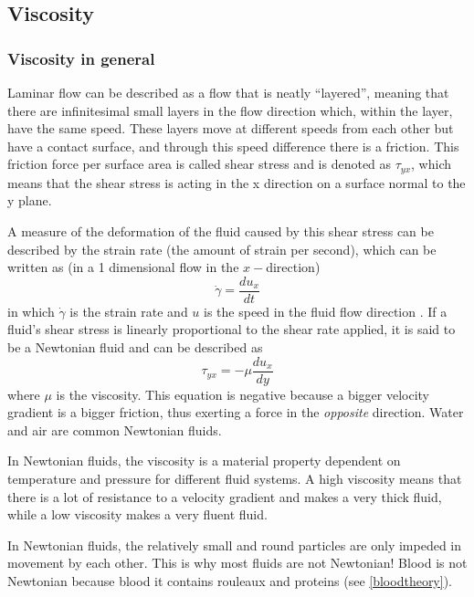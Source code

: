 \subsection{Viscosity}
\label{viscositysection}
\subsubsection{Viscosity in general}
Laminar flow can be described as a flow that is neatly ``layered'', meaning that there are infinitesimal small layers in the flow direction which, within the layer, have the same speed. These layers move at different speeds from each other but have a contact surface, and through this speed difference there is a friction. This friction force per surface area is called shear stress and is denoted as $\tau_{yx}$, which means that the shear stress is acting in the x direction on a surface normal to the y plane. 

A measure of the deformation of the fluid caused by this shear stress can be described by the strain rate (the amount of strain per second), which can be written as (in a 1 dimensional flow in the $x-$direction)
\begin{equation}
\dot{\gamma} = \frac{du_{x}}{dt}
\end{equation}
in which $\dot{\gamma}$ is the strain rate and $u$ is the speed in the fluid flow direction \cite{nonnewtonianflow}. If a fluid's shear stress is linearly proportional to the shear rate applied, it is said to be a Newtonian fluid and can be described as
\begin{equation}
\tau_{yx}= -\mu \frac{du_{x}}{dy}
\end{equation}
where $\mu$ is the viscosity. This equation is negative because a bigger velocity gradient is a bigger friction, thus exerting a force in the \emph{opposite} direction\cite{FT}. Water and air are common Newtonian fluids.

In Newtonian fluids, the viscosity is a material property dependent on temperature and pressure for different fluid systems. A high viscosity means that there is a lot of resistance to a velocity gradient and makes a very thick fluid, while a low viscosity makes a very fluent fluid.

In Newtonian fluids, the relatively small and round particles are only impeded in movement by each other. This is why most fluids are not Newtonian! Blood is not Newtonian because blood it contains rouleaux and proteins (see \autoref{bloodtheory}).
